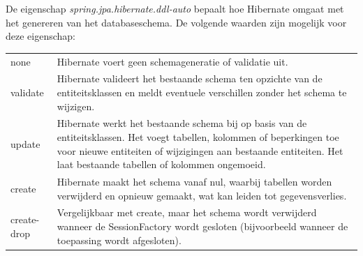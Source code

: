 

De eigenschap \textit{spring.jpa.hibernate.ddl-auto} bepaalt hoe Hibernate omgaat met het genereren van het databaseschema. 
De volgende waarden zijn mogelijk voor deze eigenschap:

\begin{tabular}{|l|p{8cm}|}
\hline
none & Hibernate voert geen schemageneratie of validatie uit.\\
validate & Hibernate valideert het bestaande schema ten opzichte van de entiteitsklassen en meldt eventuele verschillen zonder het schema te wijzigen.\\
update & Hibernate werkt het bestaande schema bij op basis van de entiteitsklassen. Het voegt tabellen, kolommen of beperkingen toe voor nieuwe entiteiten of wijzigingen aan bestaande entiteiten. Het laat bestaande tabellen of kolommen ongemoeid.\\
create & Hibernate maakt het schema vanaf nul, waarbij tabellen worden verwijderd en opnieuw gemaakt, wat kan leiden tot gegevensverlies.\\
create-drop & Vergelijkbaar met create, maar het schema wordt verwijderd wanneer de SessionFactory wordt gesloten (bijvoorbeeld wanneer de toepassing wordt afgesloten).\\
\end{tabular}

